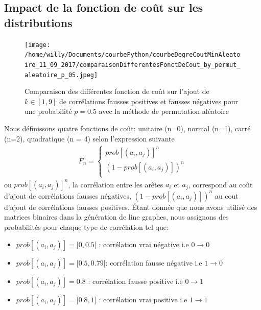 \documentclass[onecolumn, 12pt]{book}
\begin{document}
\subsection{Impact de la fonction de co\^ut sur les distributions}
\label{fonctionDeCout}
\begin{centering} 
\begin{figure}[htb!] 
\texttt{[image: /home/willy/Documents/courbePython/courbeDegreCoutMinAleatoire\_11\_09\_2017/comparaisonDifferentesFonctDeCout\_by\_permut\_aleatoire\_p\_05.jpeg]}
\caption{ Comparaison des diff\'erentes fonction de co\^ut sur l'ajout de $k \in [1,9]$ de corr\'elations fausses positives et fausses n\'egatives pour une probabilit\'e $p = 0.5$ avec la m\'ethode de permutation al\'eatoire }
\label{compareDifferentesFonctionDeCout_p05} 
\end{figure}
\end{centering} 
Nous d\'efinissons quatre fonctions de co\^ut: unitaire (n=0), normal (n=1), carr\'e (n=2), quadratique (n = 4) selon l'expression suivante
\begin{equation}
	\begin{aligned}
	F_n = 
	\begin{cases}
		prob[(a_i,a_j)]^n   \\
		(1 - prob[(a_i,a_j)])^n \\
	\end{cases}
	\end{aligned}
\end{equation}
ou $prob[(a_i,a_j)]^n$, la corr\'elation entre les ar\^etes $a_i$ et $a_j$, correspond au co\^ut d'ajout de corr\'elations fausses n\'egatives, 
$(1-prob[(a_i,a_j)])^n$ au cout d'ajout de corr\'elations fausses positives.
\newline
\'Etant donn\'ee que nous avons utilis\'e des matrices binaires dans la g\'en\'eration de line graphes, nous assignons des probabilit\'es pour chaque type de corr\'elation tel que:
\begin{itemize}
\item $prob[(a_i,a_j)] = [0, 0.5[ $ : corr\'elation vrai n\'egative i.e $0 \rightarrow 0$
\item $prob[(a_i,a_j)] = [0.5, 0.79[ $: corr\'elation fausse n\'egative i.e $1 \rightarrow 0$
\item $prob[(a_i,a_j)] = 0.8 $ : corr\'elation fausse positive i.e $0 \rightarrow 1$
\item $prob[(a_i,a_j)] = ]0.8, 1] $ : corr\'elation vrai positive i.e $1 \rightarrow 1$
\end{itemize}
\end{document}
